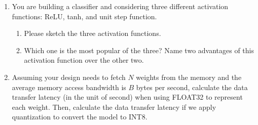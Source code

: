 \documentclass[12pt]{article}
\begin{document}
\begin{enumerate}
    \item You are building a classifier and considering three different activation functions: ReLU, tanh, and unit step function.
    \begin{enumerate}
       \item Please sketch the three activation functions. \\
       \item Which one is the most popular of the three? Name two advantages of this activation function over the other two. \\
    \end{enumerate}
    
    \item Assuming your design needs to fetch $N$ weights from the memory and the average memory access bandwidth is $B$ bytes per second, calculate the data transfer latency (in the unit of second) when using FLOAT32 to represent each weight. Then, calculate the data transfer latency if we apply quantization to convert the model to INT8. 
    
\end{enumerate}

\newpage
\end{document}
